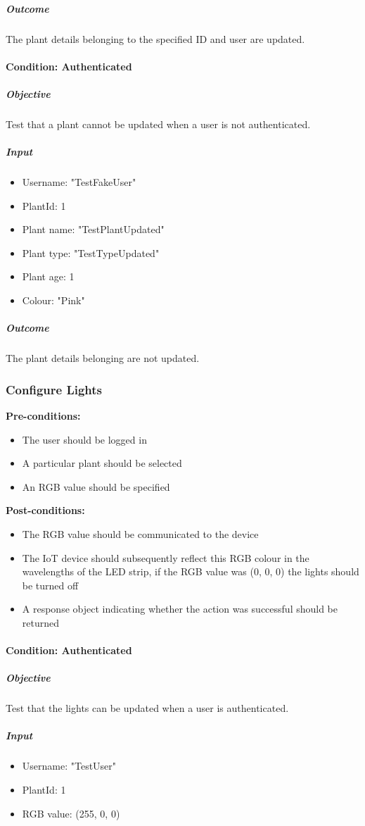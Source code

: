 \documentclass{article}
\begin{document}
		\subparagraph{Outcome}
		The plant details belonging to the specified ID and user are updated.
		
	\paragraph{Condition: Authenticated}
	\subparagraph{Objective}
	Test that a plant cannot be updated when a user is not authenticated.
	\subparagraph{Input}
	\begin{itemize}
		\item Username: "TestFakeUser"
		\item PlantId: 1
		\item Plant name: "TestPlantUpdated"
		\item Plant type: "TestTypeUpdated"
		\item Plant age: 1
		\item Colour: "Pink"
	\end{itemize}
	
	\subparagraph{Outcome}
	The plant details belonging are not updated.
		
	\subsubsection{Configure Lights}
	\textbf{Pre-conditions:}
	\begin{itemize}
		\item The user should be logged in
		\item A particular plant should be selected
		\item An RGB value should be specified
	\end{itemize}
	\textbf{Post-conditions:}
	\begin{itemize}
		\item The RGB value should be communicated to the device
		\item The IoT device should subsequently reflect this RGB colour in the wavelengths of the LED strip, if the RGB value was (0, 0, 0) the lights should be turned off
		\item A response object indicating whether the action was successful should be returned
	\end{itemize}
	
	\paragraph{Condition: Authenticated}
	\subparagraph{Objective}
	Test that the lights can be updated when a user is authenticated.
	\subparagraph{Input}
	\begin{itemize}
		\item Username: "TestUser"
		\item PlantId: 1
		\item RGB value: (255, 0, 0)
	\end{itemize}
	
\end{document}
